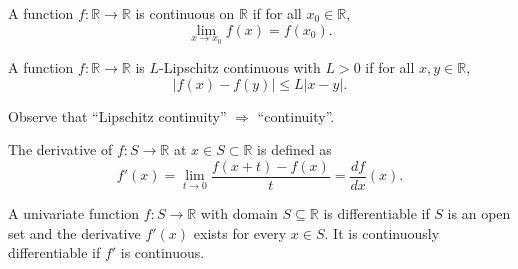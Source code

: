 \documentclass[9pt, headings=standardclasses, parskip=half]{scrartcl}
\renewcommand{\emph}[1]{\textcolor{mypurple}{#1}}
\begin{document}
\begin{definition}[Continuity]
A function \(f:\mathbb{R}\rightarrow\mathbb{R}\) is \emph{continuous} on $\mathbb{R}$ if for all \(x_{0}\in\mathbb{R}\),
\[
\lim_{x\to x_{0}}f(x)=f(x_{0}).
\]
\end{definition}

\begin{definition}
A function \(f:\mathbb{R}\rightarrow\mathbb{R}\) is \(L\)-\emph{Lipschitz continuous} with \(L>0\) if for all \(x,y\in\mathbb{R}\),
\[
|f(x)-f(y)|\leq L|x-y|.
\]
\end{definition}

Observe that ``Lipschitz continuity'' $\Longrightarrow$ ``continuity''.

\begin{definition}[Derivative]
The derivative of \(f:S\rightarrow\mathbb{R}\) at \(x\in S\subset\mathbb{R}\) is defined as
\[
f'(x)=\lim_{t\to 0}\frac{f(x+t)-f(x)}{t}=\frac{df}{dx}(x).
\]
\end{definition}

\begin{definition}[Differentiability]
A univariate function \(f:S\rightarrow\mathbb{R}\) with domain \(S\subseteq\mathbb{R}\) is \emph{differentiable} if \(S\) is an open set and the derivative \(f'(x)\) exists for every \(x\in S\). It is \emph{continuously differentiable} if \(f'\) is continuous.
\end{definition}
\end{document}
